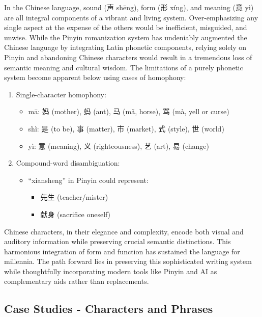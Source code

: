\documentclass[11pt,letterpaper]{article}
\begin{document}
In the Chinese language, sound (声 shēng), form (形 xíng), and meaning
(意 yì) are all integral components of a vibrant and living system.
Over-emphasizing any single aspect at the expense of the others would be
inefficient, misguided, and unwise. While the Pinyin romanization system
has undeniably augmented the Chinese language by integrating Latin
phonetic components, relying solely on Pinyin and abandoning Chinese
characters would result in a tremendous loss of semantic meaning and
cultural wisdom. The limitations of a purely phonetic system become
apparent below using cases of homophony:

\begin{enumerate}
\def\labelenumi{\arabic{enumi}.}
\tightlist
\item
  Single-character homophony:

  \begin{itemize}
  \tightlist
  \item
    mā: 妈 (mother), 蚂 (ant), 马 (mǎ, horse), 骂 (mà, yell or curse)
  \item
    shì: 是 (to be), 事 (matter), 市 (market), 式 (style), 世 (world)
  \item
    yì: 意 (meaning), 义 (righteousness), 艺 (art), 易 (change)
  \end{itemize}
\item
  Compound-word disambiguation:

  \begin{itemize}
  \tightlist
  \item
    ``xiansheng'' in Pinyin could represent:

    \begin{itemize}
    \tightlist
    \item
      先生 (teacher/mister)
    \item
      献身 (sacrifice oneself)
    \end{itemize}
  \end{itemize}
\end{enumerate}

Chinese characters, in their elegance and complexity, encode both visual
and auditory information while preserving crucial semantic distinctions.
This harmonious integration of form and function has sustained the
language for millennia. The path forward lies in preserving this
sophisticated writing system while thoughtfully incorporating modern
tools like Pinyin and AI as complementary aids rather than replacements.

\subsection{Case Studies - Characters and Phrases}\label{case-studies---characters-and-phrases}
\end{document}
